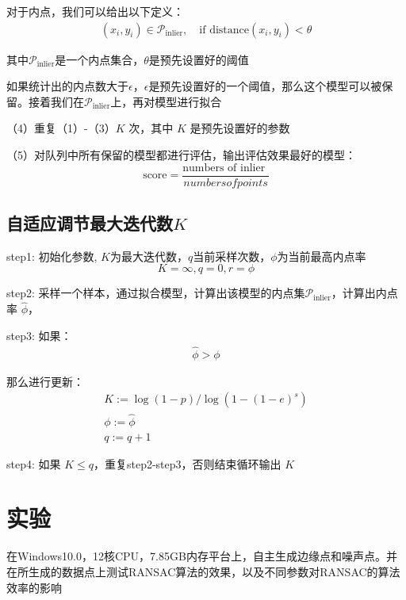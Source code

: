\documentclass{seuer}
\begin{document}
对于内点，我们可以给出以下定义：
\begin{equation}\label{EQ1}
  \begin{array}{ll}
    (x_i,y_i)\in\mathcal{P}_{\text{inlier}},\quad \text{if distance}(x_i,y_i)<\theta 
  \end{array}
\end{equation}

其中$\mathcal{P}_{\text{inlier}}$是一个内点集合，$\theta$是预先设置好的阈值

如果统计出的内点数大于$\epsilon$，$\epsilon$是预先设置好的一个阈值，那么这个模型可以被保留。接着我们在$\mathcal{P}_{\text{inlier}}$上，再对模型进行拟合

（4）重复（1）-（3）$K$ 次，其中 $K$ 是预先设置好的参数

（5）对队列中所有保留的模型都进行评估，输出评估效果最好的模型：
\begin{equation}\label{EQ1}
  \text{score}=\frac{\text{numbers of inlier  }}{numbers of points}
\end{equation}

\subsection{自适应调节最大迭代数$K$}
step1: 初始化参数, $K$为最大迭代数，$q$当前采样次数，$\phi$为当前最高内点率
\begin{equation}\label{EQ1}
  K=\infty, q = 0, r=\phi
\end{equation}

step2: 采样一个样本，通过拟合模型，计算出该模型的内点集$\mathcal{P}_{\text{inlier}}$，计算出内点率 $\hat{\phi} $，

step3: 如果：
\begin{equation}\label{EQ1}
  \begin{array}{ll}
    \hat{\phi}>\phi
  \end{array}
\end{equation}

那么进行更新：
\begin{equation}\label{EQ1}
  \begin{array}{ll}
  K :=\log (1-p) / \log \left(1-(1-e)^{s}\right)\\
  \phi := \hat{\phi}\\
  q := q + 1
  \end{array}
\end{equation}

step4: 如果 $K\leqslant  q$，重复step2-step3，否则结束循环输出 $K$

\section{实验}
\enlargethispage{-3.3cm}
在Windows10.0，12核CPU，7.85GB内存平台上，自主生成边缘点和噪声点。并在所生成的数据点上测试RANSAC算法的效果，以及不同参数对RANSAC的算法效率的影响
\end{document}
